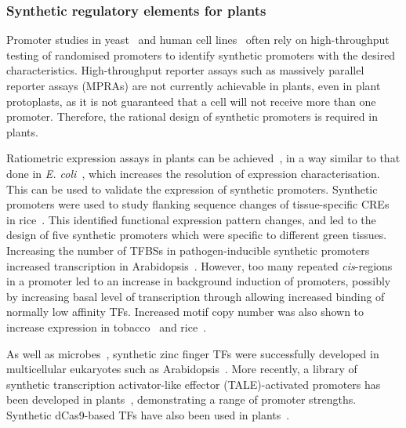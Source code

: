 \subsubsection{Synthetic regulatory elements for plants}\label{synthetic-regulatory-elements-for-plants}

Promoter studies in yeast~\autocite{reddenDevelopmentCharacterizationSynthetic2015,boerDecipheringEukaryoticGeneregulatory2019,kotopkaModeldrivenGenerationArtificial2020} and human cell lines~\autocite{mattioliHighthroughputFunctionalAnalysis2019} often rely on high\hyp{}throughput testing of randomised promoters to identify synthetic promoters with the desired characteristics.
High\hyp{}throughput reporter assays such as massively parallel reporter assays (MPRAs) are not currently achievable in plants, even in plant protoplasts, as it is not guaranteed that a cell will not receive more than one promoter.
Therefore, the rational design of synthetic promoters is required in plants.

Ratiometric expression assays in plants can be achieved~\autocite{brucknerLibrarySyntheticTranscription2015}, in a way similar to that done in \textit{E. coli}~\autocite{kellyMeasuringActivityBioBrick2009}, which increases the resolution of expression characterisation.
This can be used to validate the expression of synthetic promoters.
Synthetic promoters were used to study flanking sequence changes of tissue\hyp{}specific CREs in rice~\autocite{wangNovelGreenTissuespecific2015}.
This identified functional expression pattern changes, and led to the design of five synthetic promoters which were specific to different
green tissues.
Increasing the number of TFBSs in pathogen\hyp{}inducible synthetic promoters increased transcription in Arabidopsis~\autocite{rushtonSyntheticPlantPromoters2002}.
However, too many repeated \textit{cis}\hyp{}regions in a promoter led to an increase in background induction of promoters, possibly by increasing basal level of transcription through allowing increased binding of normally low affinity TFs.
Increased motif copy number was also shown to increase expression in tobacco~\autocite{sawantVarietySynergisticAntagonistic2005} and rice~\autocite{wuGCN4MotifRice1998a}.

As well as microbes~\autocite{khalilSyntheticBiologyFramework2012}, synthetic zinc finger TFs were successfully developed in multicellular eukaryotes such as Arabidopsis~\autocite{guanHeritableEndogenousGene2002}.
More recently, a library of synthetic transcription activator\hyp{}like effector (TALE)\hyp{}activated promoters has been developed in plants~\autocite{brucknerLibrarySyntheticTranscription2015}, demonstrating a range of promoter strengths.
Synthetic dCas9-based TFs have also been used in plants~\autocite{piatekRNAguidedTranscriptionalRegulation2015}.

